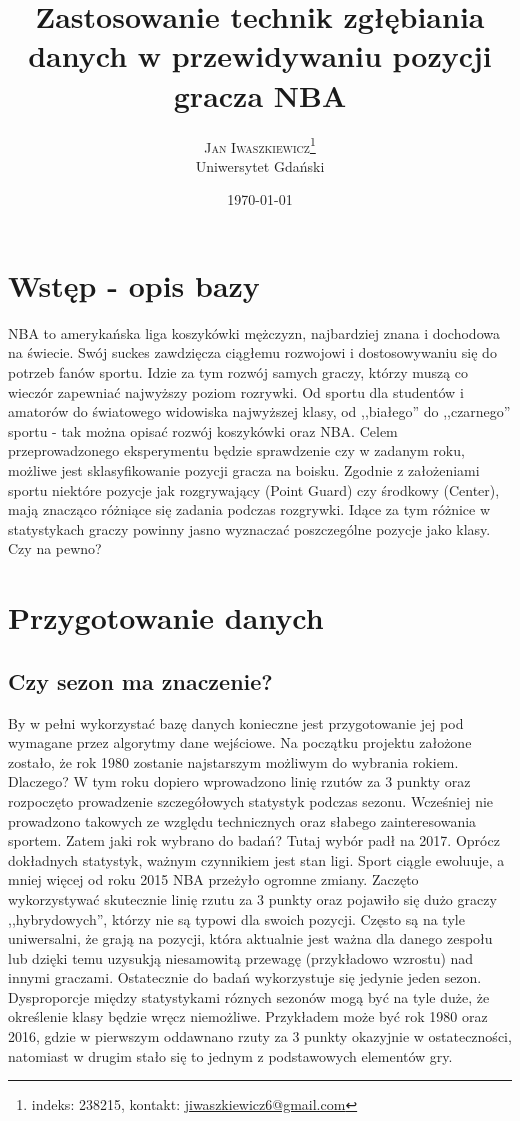 \documentclass[twoside,twocolumn]{article}
\title{Zastosowanie technik zgłębiania danych w przewidywaniu pozycji gracza NBA} %
\author{%
\textsc{Jan Iwaszkiewicz}\thanks{indeks: 238215, kontakt: \href{mailto:jiwaszkiewicz6@gmail.com}{jiwaszkiewicz6@gmail.com}} \\[1ex] %
\normalsize Uniwersytet Gdański \\ %
}
\date{\today} %
\begin{document}
\maketitle


\section{Wstęp - opis bazy}

\lettrine[nindent=0em,lines=3]NBA to amerykańska liga koszykówki mężczyzn, najbardziej znana i dochodowa na świecie. Swój suckes zawdzięcza ciągłemu rozwojowi i dostosowywaniu się do potrzeb fanów sportu. Idzie za tym rozwój samych graczy, którzy muszą co wieczór zapewniać najwyższy poziom rozrywki. Od sportu dla studentów i amatorów do światowego widowiska najwyższej klasy, od ,,białego'' do ,,czarnego'' sportu - tak można opisać rozwój koszykówki oraz NBA. Celem przeprowadzonego eksperymentu będzie sprawdzenie czy w zadanym roku, możliwe jest sklasyfikowanie pozycji gracza na boisku. Zgodnie z założeniami sportu niektóre pozycje jak rozgrywający (Point Guard) czy środkowy (Center), mają znacząco różniące się zadania podczas rozgrywki. Idące za tym różnice w statystykach graczy powinny jasno wyznaczać poszczególne pozycje jako klasy. Czy na pewno?

\section{Przygotowanie danych}
\subsection{Czy sezon ma znaczenie?}
By w pełni wykorzystać bazę danych konieczne jest przygotowanie jej pod wymagane przez algorytmy dane wejściowe. Na początku projektu założone zostało, że rok 1980 zostanie najstarszym możliwym do wybrania rokiem. Dlaczego? W tym roku dopiero wprowadzono linię rzutów za 3 punkty oraz rozpoczęto prowadzenie szczegółowych statystyk podczas sezonu. Wcześniej nie prowadzono takowych ze względu technicznych oraz słabego zainteresowania sportem. Zatem jaki rok wybrano do badań? Tutaj wybór padł na 2017. Oprócz dokładnych statystyk, ważnym czynnikiem jest stan ligi. Sport ciągle ewoluuje, a mniej więcej od roku 2015 NBA przeżyło ogromne zmiany. Zaczęto wykorzystywać skutecznie linię rzutu za 3 punkty oraz pojawiło się dużo graczy ,,hybrydowych'', którzy nie są typowi dla swoich pozycji. Często są na tyle uniwersalni, że grają na pozycji, która aktualnie jest ważna dla danego zespołu lub dzięki temu uzysukją niesamowitą przewagę (przykładowo wzrostu) nad innymi graczami. Ostatecznie do badań wykorzystuje się jedynie jeden sezon. Dysproporcje między statystykami róznych sezonów mogą być na tyle duże, że określenie klasy będzie wręcz niemożliwe. Przykładem może być rok 1980 oraz 2016, gdzie w pierwszym oddawnano rzuty za 3 punkty okazyjnie w ostateczności, natomiast w drugim stało się to jednym z podstawowych elementów gry. 
\end{document}
